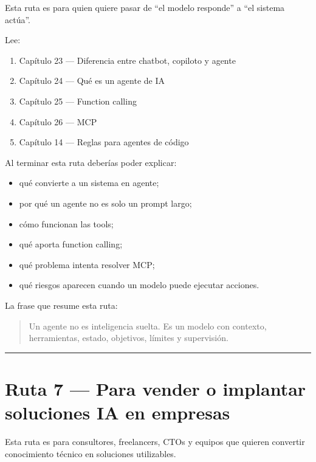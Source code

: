 Esta ruta es para quien quiere pasar de ``el modelo responde'' a ``el
sistema actúa''.

Lee:

\begin{enumerate}
\def\labelenumi{\arabic{enumi}.}
\tightlist
\item
  Capítulo 23 --- Diferencia entre chatbot, copiloto y agente
\item
  Capítulo 24 --- Qué es un agente de IA
\item
  Capítulo 25 --- Function calling
\item
  Capítulo 26 --- MCP
\item
  Capítulo 14 --- Reglas para agentes de código
\end{enumerate}

Al terminar esta ruta deberías poder explicar:

\begin{itemize}
\tightlist
\item
  qué convierte a un sistema en agente;
\item
  por qué un agente no es solo un prompt largo;
\item
  cómo funcionan las tools;
\item
  qué aporta function calling;
\item
  qué problema intenta resolver MCP;
\item
  qué riesgos aparecen cuando un modelo puede ejecutar acciones.
\end{itemize}

La frase que resume esta ruta:

\begin{quote}
Un agente no es inteligencia suelta. Es un modelo con contexto,
herramientas, estado, objetivos, límites y supervisión.
\end{quote}

\begin{center}\rule{0.5\linewidth}{0.5pt}\end{center}

\section{Ruta 7 --- Para vender o implantar soluciones IA en
empresas}\label{ruta-7-para-vender-o-implantar-soluciones-ia-en-empresas}

Esta ruta es para consultores, freelancers, CTOs y equipos que quieren
convertir conocimiento técnico en soluciones utilizables.

